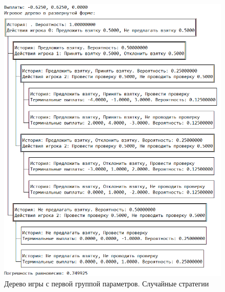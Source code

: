 \begin{figure}[H]
	\centering
	\includegraphics[width=0.9\linewidth]{inc/img/c3th11}
	\caption{Дерево игры с первой группой параметров. Случайные стратегии}
	\label{fig:c3th11}
\end{figure}

